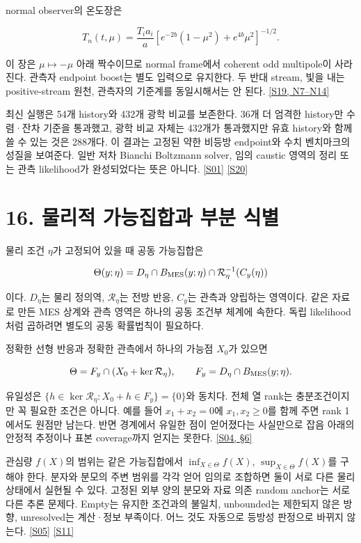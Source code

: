\documentclass[11pt,a4paper]{article}
\begin{document}
normal observer의 온도장은


\[
T_n(t,\mu)=\frac{T_i a_i}{a}
\left[e^{-2b}(1-\mu^2)+e^{4b}\mu^2\right]^{-1/2}.
\]

이 장은 \(\mu\mapsto-\mu\) 아래 짝수이므로 normal frame에서 coherent odd multipole이 사라진다. 관측자 endpoint boost는 별도 입력으로 유지한다. 두 반대 stream, 빛을 내는 positive-stream 원천, 관측자의 기준계를 동일시해서는 안 된다. \hyperlink{src:S19}{[S19, N7–N14]}


최신 실행은 54개 history와 432개 광학 비교를 보존한다. 36개 더 엄격한 history만 수렴·잔차 기준을 통과했고, 광학 비교 자체는 432개가 통과했지만 유효 history와 함께 쓸 수 있는 것은 288개다. 이 결과는 고정된 약한 비등방 endpoint와 수치 벤치마크의 성질을 보여준다. 일반 저차 Bianchi Boltzmann solver, 임의 caustic 영역의 정리 또는 관측 likelihood가 완성되었다는 뜻은 아니다. \hyperlink{src:S01}{[S01]} \hyperlink{src:S20}{[S20]}


\hypertarget{s16}{}

\section*{16. 물리적 가능집합과 부분 식별}


물리 조건 \(\eta\)가 고정되어 있을 때 공동 가능집합은


\[
\Theta(y;\eta)=D_\eta\cap B_{\rm MES}(y;\eta)
\cap\mathcal R_\eta^{-1}(C_y(\eta))
\]

이다. \(D_\eta\)는 물리 정의역, \(\mathcal R_\eta\)는 전방 반응, \(C_y\)는 관측과 양립하는 영역이다. 같은 자료로 만든 MES 상계와 관측 영역은 하나의 공동 조건부 체계에 속한다. 독립 likelihood처럼 곱하려면 별도의 공동 확률법칙이 필요하다.


정확한 선형 반응과 정확한 관측에서 하나의 가능점 \(X_0\)가 있으면


\[
\Theta=F_y\cap(X_0+\ker\mathcal R_\eta),\qquad
F_y=D_\eta\cap B_{\rm MES}(y;\eta).
\]

유일성은 \(\{h\in\ker\mathcal R_\eta:X_0+h\in F_y\}=\{0\}\)와 동치다. 전체 열 rank는 충분조건이지만 꼭 필요한 조건은 아니다. 예를 들어 \(x_1+x_2=0\)에 \(x_1,x_2\ge0\)를 함께 주면 rank 1에서도 원점만 남는다. 반면 경계에서 유일한 점이 얻어졌다는 사실만으로 잡음 아래의 안정적 추정이나 표본 coverage까지 얻지는 못한다. \hyperlink{src:S04}{[S04, §6]}


관심량 \(f(X)\)의 범위는 같은 가능집합에서 \(\inf_{X\in\Theta}f(X)\), \(\sup_{X\in\Theta}f(X)\)를 구해야 한다. 분자와 분모의 주변 범위를 각각 얻어 임의로 조합하면 둘이 서로 다른 물리 상태에서 실현될 수 있다. 고정된 외부 양의 분모와 자료 의존 random anchor는 서로 다른 추론 문제다. Empty는 유지한 조건과의 불일치, unbounded는 제한되지 않은 방향, unresolved는 계산·정보 부족이다. 어느 것도 자동으로 등방성 판정으로 바뀌지 않는다. \hyperlink{src:S05}{[S05]} \hyperlink{src:S11}{[S11]}
\end{document}
